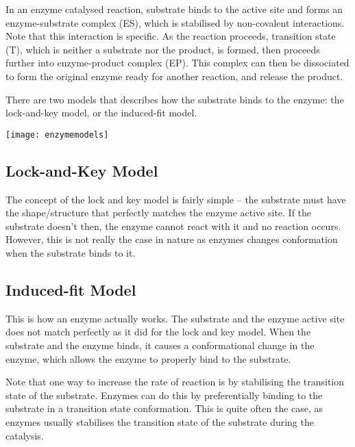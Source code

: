 \begin{center}
\end{center}

In an enzyme catalysed reaction, substrate binds to the active site and forms an enzyme-substrate complex (ES), which is stabilised by non-covalent interactions.
Note that this interaction is specific.
As the reaction proceeds, transition state (T), which is neither a substrate nor the product, is formed, then proceeds further into enzyme-product complex (EP).
This complex can then be dissociated to form the original enzyme ready for another reaction, and release the product.

There are two models that describes how the substrate binds to the enzyme: the lock-and-key model, or the induced-fit model.

\begin{center}
\texttt{[image: enzymemodels]}
\end{center}

\subsection{Lock-and-Key Model}

The concept of the lock and key model is fairly simple -- the substrate must have the shape/structure that perfectly matches the enzyme active site.
If the substrate doesn't then, the enzyme cannot react with it and no reaction occurs.
However, this is not really the case in nature as enzymes changes conformation when the substrate binds to it.

\subsection{Induced-fit Model}

This is how an enzyme actually works.
The substrate and the enzyme active site does not match perfectly as it did for the lock and key model.
When the substrate and the enzyme binds, it causes a conformational change in the enzyme, which allows the enzyme to properly bind to the substrate.

Note that one way to increase the rate of reaction is by stabilising the transition state of the substrate.
Enzymes can do this by preferentially binding to the substrate in a transition state conformation.
This is quite often the case, as enzymes usually stabilises the transition state of the substrate during the catalysis.

